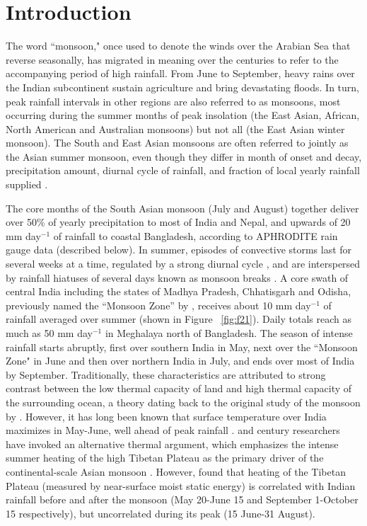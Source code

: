 \section{Introduction}

	The word ``monsoon," once used to denote the winds over the Arabian Sea that reverse seasonally, has migrated in meaning over the centuries to refer to the accompanying period of high rainfall. From June to September, heavy rains over the Indian subcontinent sustain agriculture \parencite{Gadgil2006} and bring devastating floods. In turn, peak rainfall intervals in other regions are also referred to as monsoons, most occurring during the summer months of peak insolation (the East Asian, African, North American and Australian monsoons) but not all (the East Asian winter monsoon). The South and East Asian monsoons are often referred to jointly as the Asian summer monsoon, even though they differ in month of onset and decay, precipitation amount, diurnal cycle of rainfall, and fraction of local yearly rainfall supplied \parencite{Zhou2008,Molnar2010,Biasutti2011}.

	The core months of the South Asian monsoon (July and August) together deliver over 50\% of yearly precipitation to most of India and Nepal, and upwards of 20 mm day$^{-1}$ of rainfall to coastal Bangladesh, according to APHRODITE rain gauge data (described below). In summer, episodes of convective storms last for several weeks at a time, regulated by a strong diurnal cycle \citep{Romatschke2011a}, and are interspersed by rainfall hiatuses of several days known as monsoon breaks \citep{Krishnan2000}. A core swath of central India including the states of Madhya Pradesh, Chhatisgarh and Odisha, previously named the ``Monsoon Zone'' by \textcite{Gadgil2003}, receives about 10 mm day$^{-1}$ of rainfall averaged over summer (shown in Figure ~\ref{fig:f21}). Daily totals reach as much as 50 mm day$^{-1}$ in Meghalaya north of Bangladesh. The season of intense rainfall starts abruptly, first over southern India in May, next over the ``Monsoon Zone" in June and then over northern India in July, and ends over most of India by September. Traditionally, these characteristics are attributed to strong contrast between the low thermal capacity of land and high thermal capacity of the surrounding ocean, a theory dating back to the original study of the monsoon by \cite{Halley1686}. However, it has long been known that surface temperature over India maximizes in May-June, well ahead of peak rainfall \citep{Gadgil2003}.  and  century researchers have invoked an alternative thermal argument, which emphasizes the intense summer heating of the high Tibetan Plateau as the primary driver of the continental-scale Asian monsoon \citep{Yeh1959,Li1996,Wu2007}. However, \cite{Rajagopalan2013} found that heating of the Tibetan Plateau (measured by near-surface moist static energy) is correlated with Indian rainfall before and after the monsoon  (May 20-June 15 and September 1-October 15 respectively), but uncorrelated during its peak (15 June-31 August).
	

